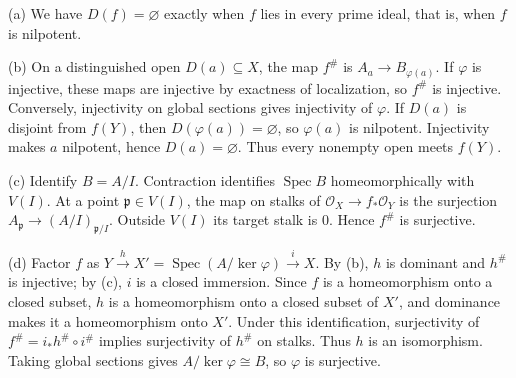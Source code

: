 (a) We have $D(f)=\varnothing$ exactly when $f$ lies in every prime ideal, that is, when $f$ is nilpotent.

(b) On a distinguished open $D(a)\subseteq X$, the map $f^\#$ is $A_a\to B_{\varphi(a)}$. If $\varphi$ is injective, these maps are injective by exactness of localization, so $f^\#$ is injective. Conversely, injectivity on global sections gives injectivity of $\varphi$. If $D(a)$ is disjoint from $f(Y)$, then $D(\varphi(a))=\varnothing$, so $\varphi(a)$ is nilpotent. Injectivity makes $a$ nilpotent, hence $D(a)=\varnothing$. Thus every nonempty open meets $f(Y)$.

(c) Identify $B=A/I$. Contraction identifies $\operatorname{Spec}B$ homeomorphically with $V(I)$. At a point $\mathfrak p\in V(I)$, the map on stalks of $\mathcal O_X\to f_*\mathcal O_Y$ is the surjection $A_{\mathfrak p}\to(A/I)_{\mathfrak p/I}$. Outside $V(I)$ its target stalk is $0$. Hence $f^\#$ is surjective.

(d) Factor $f$ as $Y\xrightarrow{h}X'=\operatorname{Spec}(A/\ker\varphi)\xrightarrow{i}X$. By (b), $h$ is dominant and $h^\#$ is injective; by (c), $i$ is a closed immersion. Since $f$ is a homeomorphism onto a closed subset, $h$ is a homeomorphism onto a closed subset of $X'$, and dominance makes it a homeomorphism onto $X'$. Under this identification, surjectivity of $f^\#=i_*h^\#\circ i^\#$ implies surjectivity of $h^\#$ on stalks. Thus $h$ is an isomorphism. Taking global sections gives $A/\ker\varphi\cong B$, so $\varphi$ is surjective.
